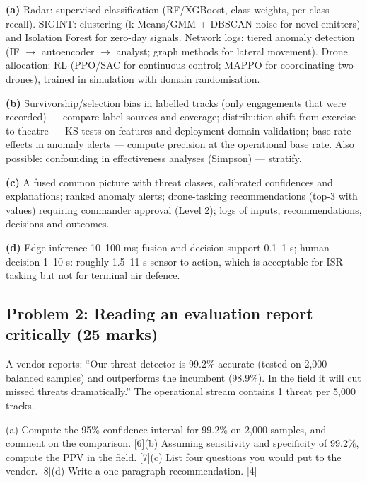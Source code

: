 \documentclass[11pt]{article}
\begin{document}
\begin{soln}\textbf{(a)} Radar: supervised classification (RF/XGBoost, class weights, per-class recall). SIGINT: clustering (k-Means/GMM + DBSCAN noise for novel emitters) and Isolation Forest for zero-day signals. Network logs: tiered anomaly detection (IF $\rightarrow$ autoencoder $\rightarrow$ analyst; graph methods for lateral movement). Drone allocation: RL (PPO/SAC for continuous control; MAPPO for coordinating two drones), trained in simulation with domain randomisation.

\textbf{(b)} Survivorship/selection bias in labelled tracks (only engagements that were recorded) --- compare label sources and coverage; distribution shift from exercise to theatre --- KS tests on features and deployment-domain validation; base-rate effects in anomaly alerts --- compute precision at the operational base rate. Also possible: confounding in effectiveness analyses (Simpson) --- stratify.

\textbf{(c)} A fused common picture with threat classes, calibrated confidences and explanations; ranked anomaly alerts; drone-tasking recommendations (top-3 with values) requiring commander approval (Level 2); logs of inputs, recommendations, decisions and outcomes.

\textbf{(d)} Edge inference 10--100 ms; fusion and decision support 0.1--1 s; human decision 1--10 s: roughly 1.5--11 s sensor-to-action, which is acceptable for ISR tasking but not for terminal air defence.\end{soln}

\subsection{Problem 2: Reading an evaluation report critically \normalfont\small\color{GreyN}(25 marks)}

\begin{prob}A vendor reports: ``Our threat detector is 99.2\% accurate (tested on 2,000 balanced samples) and outperforms the incumbent (98.9\%). In the field it will cut missed threats dramatically.'' The operational stream contains 1 threat per 5,000 tracks.

(a) Compute the 95\% confidence interval for 99.2\% on 2,000 samples, and comment on the comparison. [6]\newline (b) Assuming sensitivity and specificity of 99.2\%, compute the PPV in the field. [7]\newline (c) List four questions you would put to the vendor. [8]\newline (d) Write a one-paragraph recommendation. [4]\end{prob}
\end{document}
